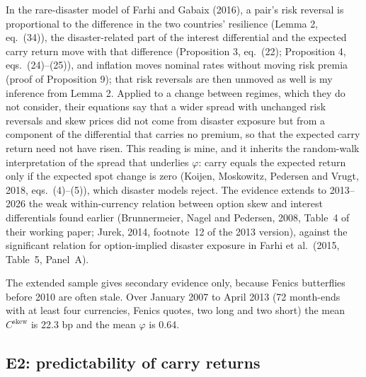 \documentclass[11pt]{article}
\theoremstyle{result}
\newcommand{\Cskew}{C^{\mathrm{skew}}}
\begin{document}
In the rare-disaster model of Farhi and Gabaix (2016), a pair's risk reversal is proportional to the difference in the two countries' resilience (Lemma 2, eq.~(34)), the disaster-related part of the interest differential and the expected carry return move with that difference (Proposition 3, eq.~(22); Proposition 4, eqs.~(24)--(25)), and inflation moves nominal rates without moving risk premia (proof of Proposition 9); that risk reversals are then unmoved as well is my inference from Lemma 2. Applied to a change between regimes, which they do not consider, their equations say that a wider spread with unchanged risk reversals and skew prices did not come from disaster exposure but from a component of the differential that carries no premium, so that the expected carry return need not have risen. This reading is mine, and it inherits the random-walk interpretation of the spread that underlies $\varphi$: carry equals the expected return only if the expected spot change is zero (Koijen, Moskowitz, Pedersen and Vrugt, 2018, eqs.~(4)--(5)), which disaster models reject. The evidence extends to 2013--2026 the weak within-currency relation between option skew and interest differentials found earlier (Brunnermeier, Nagel and Pedersen, 2008, Table~4 of their working paper; Jurek, 2014, footnote~12 of the 2013 version), against the significant relation for option-implied disaster exposure in Farhi et al.\ (2015, Table~5, Panel~A).

The extended sample gives secondary evidence only, because Fenics butterflies before 2010 are often stale. Over January 2007 to April 2013 (72 month-ends with at least four currencies, Fenics quotes, two long and two short) the mean $\Cskew$ is 22.3 bp and the mean $\varphi$ is 0.64.

\subsection{E2: predictability of carry returns}\label{sec:e2}
\end{document}
